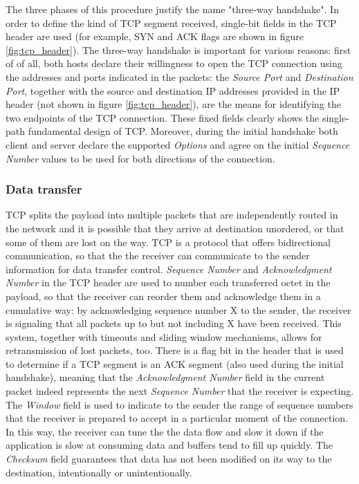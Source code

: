 The three phases of this procedure justify the name "three-way handshake". In order to define the kind of TCP segment received, single-bit fields in the TCP header are used (for example, SYN and ACK flags are shown in figure \ref{fig:tcp_header}). 
The three-way handshake is important for various reasons: first of of all, both hosts declare their willingness to open the TCP connection using the addresses and ports indicated in the packets: the \textit{Source Port} and \textit{Destination Port}, together with the source and destination IP addresses provided in the IP header (not shown in figure \ref{fig:tcp_header}), are the means for identifying the two endpoints of the TCP connection. These fixed fields clearly shows the single-path fundamental design of TCP. 
Moreover, during the initial handshake both client and server declare the supported \textit{Options} and agree on the initial \textit{Sequence Number} values to be used for both directions of the connection.

\subsubsection{Data transfer}
TCP splits the payload into multiple packets that are independently routed in the network and it is possible that they arrive at destination unordered, or that some of them are lost on the way. TCP is a protocol that offers bidirectional communication, so that the the receiver can communicate to the sender information for data transfer control. \textit{Sequence Number} and \textit{Acknowledgment Number} in the TCP header are used to number each transferred octet in the payload, so that the receiver can reorder them and acknowledge them in a cumulative way: by acknowledging sequence number X to the sender, the receiver is signaling that all packets up to but not including X have been received. This system, together with timeouts and sliding window mechanisms, allows for retransmission of lost packets, too. There is a flag bit in the header that is used to determine if a TCP segment is an ACK segment (also used during the initial handshake), meaning that the \textit{Acknowledgment Number} field in the current packet indeed represents the next \textit{Sequence Number} that the receiver is expecting. 
The \textit{Window} field is used to indicate to the sender the range of sequence numbers that the receiver is prepared to accept in a particular moment of the connection. In this way, the receiver can tune the the data flow and slow it down if the application is slow at consuming data and buffers tend to fill up quickly. The \textit{Checksum} field guarantees that data has not been modified on its way to the destination, intentionally or unintentionally.

